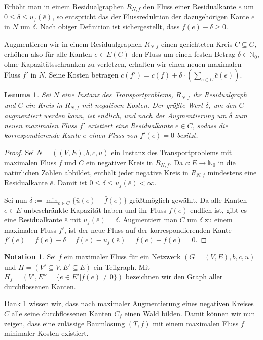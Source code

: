 \documentclass[a4paper,twoside,ngerman]{report}
\theoremstyle{plain}
\newtheorem{lem}[thm]{Lemma}
\theoremstyle{definition}
\newtheorem*{nota}{Notation}
\begin{document}
Erhöht man in einem Residualgraphen $R_{N,f}$ den Fluss einer Residualkante $\bar{e}$ um $0\leq\delta\leq u_f(\bar{e})$, so entspricht das der Flussreduktion der dazugehörigen Kante $e$ in $N$ um $\delta$. Nach obiger Definition ist sichergestellt, dass $f(e)-\delta\geq0$.

Augmentieren wir in einem Residualgraphen $R_{N,f}$ einen gerichteten Kreis $C\subseteq G$, erhöhen also für alle Kanten $e\in E(C)$ den Fluss um einen festen Betrag $\delta\in\mathbb{N}_0$, ohne Kapazitätsschranken zu verletzen, erhalten wir einen neuen maximalen Fluss $f'$ in $N$. Seine Kosten betragen $c(f')=c(f) + \delta\cdot(\sum_{e\in C} \bar{c}(e))$.

\begin{lem}\label{negKreis}Sei $N$ eine Instanz des Transportproblems, $R_{N,f}$ ihr Residualgraph und $C$ ein Kreis in $R_{N,f}$ mit negativen Kosten. Der größte Wert $\delta$, um den $C$ augmentiert werden kann, ist endlich, und nach der Augmentierung um $\delta$ zum neuen maximalen Fluss $f'$ existiert eine Residualkante $\bar{e}\in C$, sodass die korrespondierende Kante $e$ einen Fluss von $f'(e)=0$ besitzt. 
\end{lem}
\begin{proof}Sei $N=((V,E),b,c,u)$ ein Instanz des Transportproblems mit maximalen Fluss $f$ und $C$ ein negativer Kreis in $R_{N,f}$. Da $c:E\rightarrow\mathbb{N}_0$ in die natürlichen Zahlen abbildet, enthält jeder negative Kreis in $R_{N,f}$ mindestens eine Residualkante $\bar{e}$. Damit ist $0\leq\delta\leq u_f(\bar{e})<\infty$.
	
Sei nun $\delta:=\min_{e\in C}\{\bar{u}(e)-\bar{f}(e)\}$ größtmöglich gewählt. Da alle Kanten $e\in E$ unbeschränkte Kapazität haben und ihr Fluss $f(e)$ endlich ist, gibt es eine Residualkante $\bar{e}$ mit $u_f(\bar{e})=\delta$. Augmentiert man $C$ um $\delta$ zu einem maximalen Fluss $f'$, ist der neue Fluss auf der korrespondierenden Kante $f'(e)=f(e)-\delta=f(e)-u_f(\bar{e})=f(e)-f(e)=0$.\end{proof}

\begin{nota}Sei $f$ ein maximaler Fluss für ein Netzwerk $(G=(V,E),b,c,u)$ und $H=(V'\subseteq V, E'\subseteq E)$ ein Teilgraph. Mit $H_f=(V',E''=\{e\in E' | f(e) \neq 0\})$ bezeichnen wir den Graph aller durchflossenen Kanten.\end{nota}

Dank \cref{negKreis} wissen wir, dass nach maximaler Augmentierung eines negativen Kreises $C$ alle seine durchflossenen Kanten $C_f$ einen Wald bilden. Damit können wir nun zeigen, dass eine zulässige Baumlösung $(T,f)$ mit einem maximalen Fluss $f$ minimaler Kosten existiert.
\end{document}
